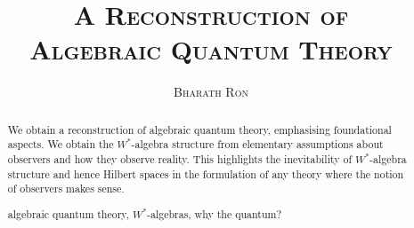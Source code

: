 \documentclass[11pt]{article}
\begin{document}
{\author{\textsc{Bharath Ron}}
\title{{{\LARGE \bfseries \textsc{A Reconstruction of}}\\\vspace{0em}\huge\bfseries\textsc{{Algebraic Quantum Theory}}}\\\vspace{0em}}}
\date{}
\maketitle
\vspace{2em}
\begin{adjustwidth}{3em}{3em}
\begin{abstract}
\vspace{.25em}
\noindent We obtain a reconstruction of algebraic quantum theory, emphasising foundational aspects. We obtain the $W^*$-algebra structure from elementary assumptions about observers and how they observe reality. This highlights the inevitability of $W^*$-algebra structure and hence Hilbert spaces in the formulation of any theory where the notion of observers makes sense.\\\par

 algebraic quantum theory, $W^*$-algebras, why the quantum?
\end{abstract}
\end{adjustwidth}
\end{document}
